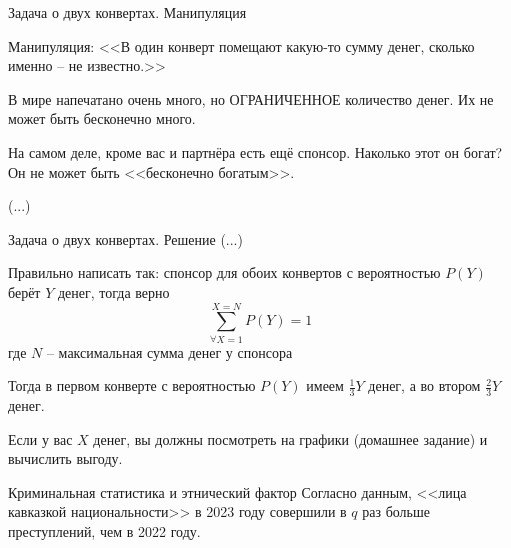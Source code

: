 \begin{frame}{Задача о двух конвертах. Манипуляция}

Манипуляция: 
<<В один конверт помещают какую-то сумму денег,
сколько именно -- не известно.>>

В мире напечатано очень много, но ОГРАНИЧЕННОЕ 
количество денег.
Их не может быть бесконечно много.

На самом деле, кроме вас и партнёра есть ещё спонсор.
Наколько этот он богат?
Он не может быть <<бесконечно богатым>>.

(...)
\end{frame}

\begin{frame}{Задача о двух конвертах. Решение}
\small
(...)

Правильно написать так:
спонсор для обоих конвертов с вероятностью $P(Y)$ берёт $Y$ денег,
тогда верно
\begin{equation}
\sum_{\forall X=1}^{X=N} P(Y) = 1
\end{equation}
где $N$ -- максимальная сумма денег у спонсора	

Тогда в первом конверте с вероятностью $P(Y)$ имеем $\frac{1}{3}Y$ денег,
а во втором $\frac{2}{3}Y$ денег.


Если у вас $X$ денег,
вы должны посмотреть на графики (домашнее задание)
и вычислить выгоду.

	



\end{frame}

\begin{frame}[fragile,t]{Криминальная статистика и этнический фактор}
\footnotesize
Согласно данным, <<лица кавказкой национальности>> в 2023 году совершили 
в $q$ раз больше преступлений, чем в 2022 году.

	
	
\end{frame}


